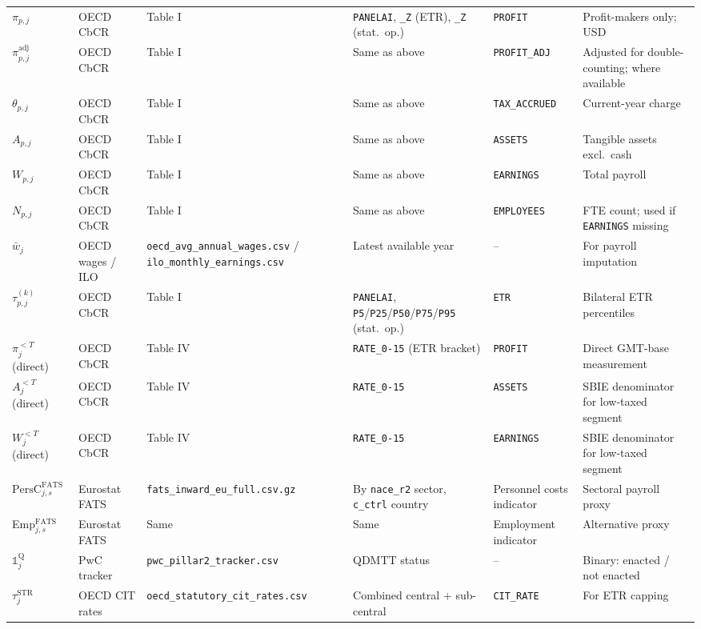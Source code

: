 \documentclass[11pt,a4paper]{article}
\newcommand{\code}[1]{\texttt{#1}}
\begin{document}
\begin{landscape}
\begin{longtable}{@{}p{2.5cm}p{3cm}p{2cm}p{2.5cm}p{3cm}p{3cm}@{}}
$\pi_{p,j}$ & OECD CbCR & Table I & \code{PANELAI}, \code{\_Z} (ETR), \code{\_Z} (stat.\ op.) & \code{PROFIT} & Profit-makers only; USD \\
$\pi_{p,j}^{\text{adj}}$ & OECD CbCR & Table I & Same as above & \code{PROFIT\_ADJ} & Adjusted for double-counting; where available \\
$\theta_{p,j}$ & OECD CbCR & Table I & Same as above & \code{TAX\_ACCRUED} & Current-year charge \\
$A_{p,j}$ & OECD CbCR & Table I & Same as above & \code{ASSETS} & Tangible assets excl.\ cash \\
$W_{p,j}$ & OECD CbCR & Table I & Same as above & \code{EARNINGS} & Total payroll \\
$N_{p,j}$ & OECD CbCR & Table I & Same as above & \code{EMPLOYEES} & FTE count; used if \code{EARNINGS} missing \\
$\bar{w}_j$ & OECD wages / ILO & \code{oecd\_avg\_annual\_wages.csv} / \code{ilo\_monthly\_earnings.csv} & Latest available year & -- & For payroll imputation \\
$\tau_{p,j}^{(k)}$ & OECD CbCR & Table I & \code{PANELAI}, \code{P5}/\code{P25}/\code{P50}/\code{P75}/\code{P95} (stat.\ op.) & \code{ETR} & Bilateral ETR percentiles \\
$\pi_j^{<T}$ (direct) & OECD CbCR & Table IV & \code{RATE\_0-15} (ETR bracket) & \code{PROFIT} & Direct GMT-base measurement \\
$A_j^{<T}$ (direct) & OECD CbCR & Table IV & \code{RATE\_0-15} & \code{ASSETS} & SBIE denominator for low-taxed segment \\
$W_j^{<T}$ (direct) & OECD CbCR & Table IV & \code{RATE\_0-15} & \code{EARNINGS} & SBIE denominator for low-taxed segment \\
$\text{PersC}_{j,s}^{\text{FATS}}$ & Eurostat FATS & \code{fats\_inward\_eu\_full.csv.gz} & By \code{nace\_r2} sector, \code{c\_ctrl} country & Personnel costs indicator & Sectoral payroll proxy \\
Emp$_{j,s}^{\text{FATS}}$ & Eurostat FATS & Same & Same & Employment indicator & Alternative proxy \\
$\mathbb{1}_j^{\text{Q}}$ & PwC tracker & \code{pwc\_pillar2\_tracker.csv} & QDMTT status & -- & Binary: enacted / not enacted \\
$\tau_j^{\text{STR}}$ & OECD CIT rates & \code{oecd\_statutory\_cit\_rates.csv} & Combined central + sub-central & \code{CIT\_RATE} & For ETR capping \\

\end{longtable}
\end{landscape}
\end{document}
